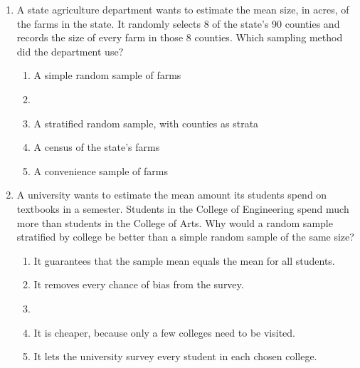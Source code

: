 \documentclass[12pt]{article}
\begin{document}
\begin{enumerate}[leftmargin=1.9em, itemsep=0.10in]

  \item A state agriculture department wants to estimate the mean size, in acres, of the farms
        in the state. It randomly selects 8 of the state's 90 counties and records the size of
        every farm in those 8 counties. Which sampling method did the department use?
        \begin{enumerate}[label=\textbf{(\Alph*)}, leftmargin=2.2em, itemsep=1pt]
          \item A simple random sample of farms
          \item {}
          \item A stratified random sample, with counties as strata
          \item A census of the state's farms
          \item A convenience sample of farms
                \hfill{}\rule[-0.2in]{0pt}{0.48in}
        \end{enumerate}

  \item A university wants to estimate the mean amount its students spend on textbooks in a
        semester. Students in the College of Engineering spend much more than students in the
        College of Arts. Why would a random sample stratified by college be better than a simple
        random sample of the same size?
        \begin{enumerate}[label=\textbf{(\Alph*)}, leftmargin=2.2em, itemsep=1pt]
          \item It guarantees that the sample mean equals the mean for all students.
          \item It removes every chance of bias from the survey.
          \item {}
          \item It is cheaper, because only a few colleges need to be visited.
          \item It lets the university survey every student in each chosen college.
                \hfill{}\rule[-0.2in]{0pt}{0.48in}
        \end{enumerate}

\end{enumerate}
\end{document}
